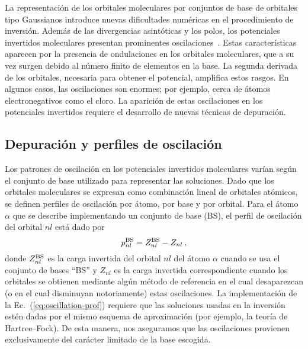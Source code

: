 La representación de los orbitales moleculares por conjuntos de base de 
orbitales tipo Gaussianos introduce nuevas dificultades numéricas en el 
procedimiento de inversión. Además de las divergencias asintóticas y los 
polos, los potenciales invertidos moleculares presentan prominentes 
oscilaciones~\cite{Schipper:97,Jacob:11,Gaiduk:13}. Estas 
características aparecen por la presencia de ondulaciones en los 
orbitales moleculares, que a su vez surgen debido al número finito de 
elementos en 
la base. La segunda derivada de los orbitales, necesaria para obtener el 
potencial, amplifica estos rasgos. En algunos casos, las 
oscilaciones son enormes; por ejemplo, cerca de átomos electronegativos 
como el cloro. La aparición de estas oscilaciones en los potenciales 
invertidos requiere el desarrollo de nuevas técnicas de depuración.

\subsection{Depuración y perfiles de oscilación}
\label{sec:invmol}

Los patrones de oscilación en los potenciales invertidos moleculares 
varían según el conjunto de base utilizado para representar las 
soluciones. Dado que los orbitales moleculares se expresan como 
combinación lineal de orbitales atómicos, se definen perfiles de 
oscilación por átomo, por base y por orbital. Para el átomo $\alpha$ que 
se describe implementando un conjunto de base (BS), el perfil de 
oscilación del orbital $nl$ está dado por
\begin{equation}
 p_{nl}^{\mbox{\scriptsize BS}} = Z_{nl}^{\mbox{\scriptsize BS}}-
 Z_{nl} \,,
 \label{eq:oscillation-prof}
\end{equation}
donde $Z_{nl}^{\mbox{\scriptsize BS}}$ es la carga invertida del orbital
$nl$ del átomo $\alpha$ cuando se usa el conjunto de bases ``BS'' y 
$Z_{nl}$ es la carga invertida correspondiente cuando los orbitales se 
obtienen mediante algún método de referencia en el cual desaparezcan 
(o en el cual disminuyan notoriamente) estas oscilaciones. La 
implementación de la Ec.~(\ref{eq:oscillation-prof}) requiere que las 
soluciones usadas en la 
inversión estén dadas por el mismo esquema de aproximación (por ejemplo, 
la teoría de Hartree--Fock). De esta manera, nos aseguramos que las 
oscilaciones provienen exclusivamente del carácter limitado de la base
escogida.

